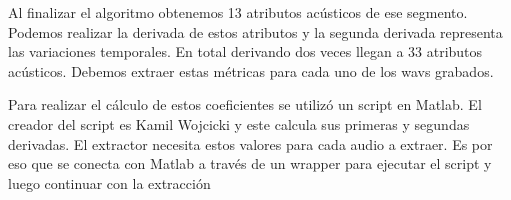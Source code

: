 Al finalizar el algoritmo obtenemos 13 atributos acústicos de ese segmento. Podemos realizar la derivada de estos atributos y la segunda derivada representa las variaciones temporales. En total derivando dos veces llegan a 33 atributos acústicos. Debemos extraer estas métricas para cada uno de los wavs grabados.

Para realizar el cálculo de estos coeficientes se utilizó un script en Matlab. El creador del script es Kamil Wojcicki y este calcula  sus primeras y segundas derivadas. El extractor necesita estos valores para cada audio a extraer. Es por eso que se conecta con Matlab a través de un wrapper para ejecutar el script y luego continuar con la extracción

%
%
%
%
%
%
